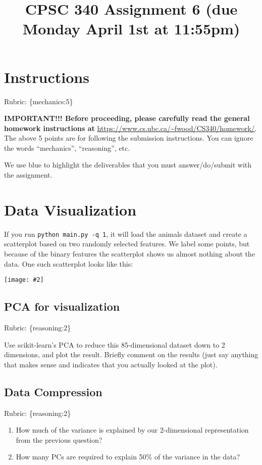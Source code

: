 \documentclass{article}
\def\rubric#1{\gre{Rubric: \{#1\}}}{}
\def\blu#1{{\color{blu}#1}}
\def\gre#1{{\color{gre}#1}}
\newcommand{\centerfig}[2]{\begin{center}\texttt{[image: \#2]}\end{center}}
\def\enum#1{\begin{enumerate}#1\end{enumerate}}
\begin{document}
\title{CPSC 340 Assignment 6 (due Monday April 1st at 11:55pm)}
\date{}
\maketitle

\vspace{-7em}


\section*{Instructions}
\rubric{mechanics:5}

\textbf{IMPORTANT!!! Before proceeding, please carefully read the general homework instructions at} \url{https://www.cs.ubc.ca/~fwood/CS340/homework/}. The above 5 points are for following the submission instructions. You can ignore the words ``mechanics'', ``reasoning'', etc.

\vspace{1em}
We use \blu{blue} to highlight the deliverables that you must answer/do/submit with the assignment.

\section{Data Visualization}

If you run \verb|python main.py -q 1|, it will load the animals dataset and create a scatterplot based on two randomly selected features.
We label some points, but because of the binary features the scatterplot shows us almost nothing about the data. One such scatterplot looks like this:

\centerfig{.5}{../figs/two_random_features.png}

\subsection{PCA for visualization}
\rubric{reasoning:2}

Use scikit-learn's PCA to reduce this 85-dimensional dataset down to 2 dimensions, and plot the result. Briefly comment on the results (just say anything that makes sense and indicates that you actually looked at the plot).

\subsection{Data Compression}
\rubric{reasoning:2}

\blu{\enum{
\item How much of the variance is explained by our 2-dimensional representation from the previous question?
\item How many PCs are required to explain 50\% of the variance in the data?
}}
\end{document}
